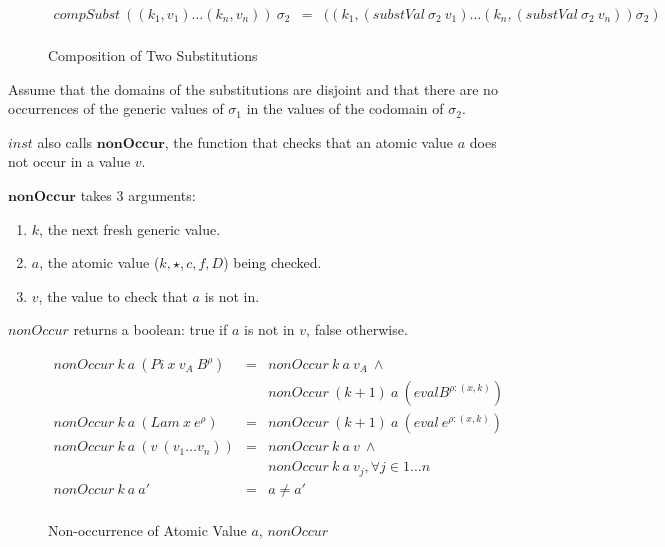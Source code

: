 \documentclass[acmsmall]{acmart}
\begin{document}
\begin{figure}[H]
  \begin{equation*}
    \begin{aligned}
      compSubst \: ((k_1,v_1) \dots (k_n,v_n)) \: \sigma_2 & = & ((k_1, (substVal \: \sigma_2 \: v_1) \dots (k_n,(substVal \: \sigma_2 \: v_n)) \sigma_2) \\
    \end{aligned}
  \end{equation*}
  \caption{Composition of Two Substitutions}
\end{figure}

Assume that the domains of the substitutions are disjoint and that there are no occurrences of the generic values of $\sigma_1$ in the values of the codomain of $\sigma_2$.

$inst$ also calls $\boldsymbol{nonOccur}$, the function that checks that an atomic value $a$ does not occur in a value $v$. 

$\boldsymbol{nonOccur}$ takes 3 arguments:

\begin{enumerate}
  \item $k$, the next fresh generic value.
  \item $a$, the atomic value ($k, \star, c, f, D$) being checked.
  \item $v$, the value to check that $a$ is not in.
\end{enumerate}

$nonOccur$ returns a boolean: true if $a$ is not in $v$, false otherwise.  

\begin{figure}[H]
  \begin{equation*}
    \begin{aligned}
      nonOccur \: k \: a \: (Pi \: x \: v_A \: B^{\rho}) & = & nonOccur \: k \: a \: v_A \: \land                   \\
                                                         &   & nonOccur \: (k+1) \: a \: (eval B^{\rho:(x,k)})      \\
      nonOccur \: k \: a \: (Lam \: x \: e^{\rho})       & = & nonOccur \: (k+1) \: a \: (eval \: e^{\rho:(x,k)})   \\
      nonOccur \: k \: a \: (v \: (v_1 \dots v_n))       & = & nonOccur \: k \: a \: v \: \land                     \\                                                        
                                                         &   & nonOccur \: k \: a \: v_j, \forall j \in {1 \dots n} \\
      nonOccur \: k \: a \: a'                           & = & a \neq a'                                            \\
    \end{aligned}
  \end{equation*}
  \caption{Non-occurrence of Atomic Value $a$, $nonOccur$}
  \label{fig:nonOccur}
\end{figure}
\end{document}
